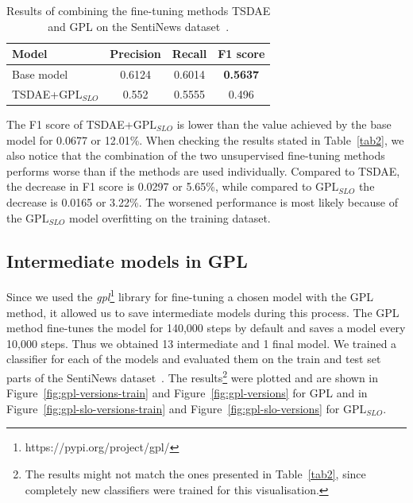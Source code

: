\documentclass[fleqn,moreauthors,10pt]{ds_report}
\begin{document}
\begin{table}[!h]
	\footnotesize
	\begin{center}
		\begin{tabular}{ |l|c|c|c| }
		\hline
		\rowcolor{Blue}Model & Precision & Recall & F1 score\\
		\hline

		Base model & 0.6124 & 0.6014 & \textbf{0.5637}\\
		TSDAE+$\text{GPL}_{SLO}$ & 0.552 & 0.5555 & 0.496\\

		\hline
		\end{tabular}
	\end{center}
\caption{Results of combining the fine-tuning methods TSDAE and GPL on the SentiNews dataset~\cite{sentiNews}.}
\label{tab3}
\end{table}

The F1 score of TSDAE+$\text{GPL}_{SLO}$ is lower than the value achieved by the base model for 0.0677 or 12.01\%. When checking the results stated in Table~\ref{tab2}, we also notice that the combination of the two unsupervised fine-tuning methods performs worse than if the methods are used individually. Compared to TSDAE, the decrease in F1 score is 0.0297 or 5.65\%, while compared to $\text{GPL}_{SLO}$ the decrease is 0.0165 or 3.22\%. The worsened performance is most likely because of the $\text{GPL}_{SLO}$ model overfitting on the training dataset.


\subsection*{Intermediate models in GPL}
\label{intermediate-paraphrase}
Since we used the \textit{gpl}\footnote{https://pypi.org/project/gpl/} library for fine-tuning a chosen model with the GPL method, it allowed us to save intermediate models during this process. The GPL method fine-tunes the model for 140,000 steps by default and saves a model every 10,000 steps. Thus we obtained 13 intermediate and 1 final model. We trained a classifier for each of the models and evaluated them on the train and test set parts of the SentiNews dataset~\cite{sentiNews}. The results\footnote{The results might not match the ones presented in Table~\ref{tab2}, since completely new classifiers were trained for this visualisation.} were plotted and are shown in Figure~\ref{fig:gpl-versions-train} and Figure~\ref{fig:gpl-versions} for GPL and in Figure~\ref{fig:gpl-slo-versions-train} and Figure~\ref{fig:gpl-slo-versions} for $\text{GPL}_{SLO}$.
\end{document}
